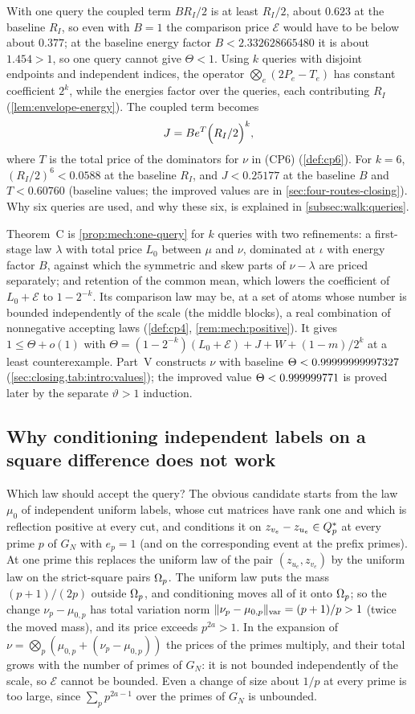 With one query the coupled term $BR_I/2$ is at least $R_I/2$, about
$0.623$ at the baseline $R_I$, so even with $B=1$ the comparison
price $\mathcal E$ would have to be below about $0.377$; at the
baseline energy factor $B<2.332628665480$ it is about $1.454>1$, so
one query cannot give $\Theta<1$. Using $k$ queries with disjoint
endpoints and independent indices, the operator
$\bigotimes_e(2P_e-T_e)$ has constant coefficient $2^k$, while the
energies factor over the queries, each contributing $R_I$
(\cref{lem:envelope-energy}). The coupled term becomes
\[
 J=Be^T\Bigl(\frac{R_I}2\Bigr)^k,
\]
where $T$ is the total price of the dominators for $\nu$ in (CP6)
(\cref{def:cp6}). For $k=6$, $(R_I/2)^6<0.0588$ at the baseline
$R_I$, and $J<0.25177$ at the baseline $B$ and $T<0.60760$
(baseline values; the improved values are in
\cref{sec:four-routes-closing}). Why six queries are used, and
why these six, is explained in \cref{subsec:walk:queries}.

Theorem~C is \cref{prop:mech:one-query} for $k$ queries with two
refinements: a first-stage law $\lambda$ with total price $L_0$
between $\mu$ and $\nu$, dominated at $\iota$ with energy factor $B$,
against which the symmetric and skew parts of $\nu-\lambda$ are
priced separately; and retention of the common mean, which lowers
the coefficient of $L_0+\mathcal E$ to $1-2^{-k}$. Its comparison
law may be, at a set of atoms whose number is bounded
independently of the scale (the middle blocks), a real combination
of
nonnegative accepting laws (\cref{def:cp4},
\cref{rem:mech:positive}). It gives $1\le\Theta+o(1)$ with
$\Theta=(1-2^{-k})(L_0+\mathcal E)+J+W+(1-m)/2^k$ at a least
counterexample. Part~V constructs $\nu$ with baseline
$\Theta<\PushTheta$ (\cref{sec:closing,tab:intro:values}); the
improved value $\Theta<\FourRoutesTheta$ is proved later by the
separate $\vartheta>1$ induction.

\subsection{Why conditioning independent labels on a square difference does not work}\label{subsec:mech:crude}

Which law should accept the query? The obvious candidate starts from the
law $\mu_0$ of independent uniform labels, whose cut matrices have rank one
and which is reflection positive at every cut, and conditions it on
$z_{v_e}-z_{u_e}\in\Qsq$ at every prime $p$ of $G_N$ with $e_p=1$ (and on the
corresponding event at the prefix primes). At one prime this replaces the
uniform law of the pair $(z_{u_e},z_{v_e})$ by the uniform law on the
strict-square pairs $\Om$. The uniform law puts the mass $(p+1)/(2p)$
outside $\Om$, and conditioning moves all of it onto $\Om$; so the change
$\nu_p-\mu_{0,p}$ has total variation norm
$\|\nu_p-\mu_{0,p}\|_{\rm var}=(p+1)/p>1$ (twice the moved mass),
and its price exceeds
$p^{2a}>1$. In the expansion of
$\nu=\bigotimes_p(\mu_{0,p}+(\nu_p-\mu_{0,p}))$ the prices of the primes
multiply, and their total grows with the number of primes of $G_N$: it is
not bounded independently of the scale, so $\mathcal E$ cannot be
bounded. Even a change of size about $1/p$ at every prime is too
large, since $\sum_pp^{2a-1}$ over the primes of $G_N$ is unbounded.

